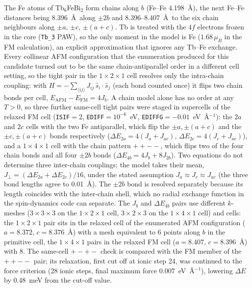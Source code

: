 \documentclass[aps,prb,preprint,superscriptaddress,longbibliography,nofootinbib]{revtex4-2}
\begin{document}
The Fe atoms of Tb$_6$FeBi$_2$ form chains along $b$ (Fe--Fe 4.198~\AA), the next Fe--Fe distances being
8.396~\AA\ along $\pm2b$ and 8.396--8.407~\AA\ to the six chain neighbours along $\pm a$, $\pm c$, $\pm(a+c)$.
Tb is treated with the $4f$ electrons frozen in the core (\texttt{Tb\_3} PAW), so the only moment in the model
is Fe ($1.68\,\mu_B$ in the FM calculation), an explicit approximation that ignores any Tb--Fe exchange. Every
collinear AFM configuration that the enumeration produced for this candidate turned out to be the same
chain-antiparallel order in a different cell setting, so the tight pair in the $1\times2\times1$ cell resolves
only the intra-chain coupling: with $H=-\sum_{\langle ij\rangle}J_{ij}\,\hat{s}_i\!\cdot\!\hat{s}_j$ (each bond
counted once) it flips two chain bonds per cell, $E_\mathrm{AFM}-E_\mathrm{FM}=4J_b$. A chain model alone has
no order at any $T>0$, so three further same-cell tight pairs were staged in supercells of the relaxed FM cell
(\texttt{ISIF}$=2$, \texttt{EDIFF}$=10^{-6}$~eV, \texttt{EDIFFG}$=-0.01$~eV~\AA$^{-1}$): the $2a$ and $2c$
cells with the two Fe antiparallel, which flip the $\pm a,\pm(a+c)$ and the $\pm c,\pm(a+c)$ bonds
respectively ($\Delta E_{2a}=4(J_a+J_{ac})$, $\Delta E_{2c}=4(J_c+J_{ac})$), and a $1\times4\times1$ cell with
the chain pattern $++--$, which flips two of the four chain bonds and all four $\pm2b$ bonds
($\Delta E_{4b}=4J_b+8J_{2b}$). Two equations do not determine three inter-chain couplings; the model takes
their mean, $J_\perp=(\Delta E_{2a}+\Delta E_{2c})/16$, under the stated assumption $J_a\approx J_c\approx
J_{ac}$ (the three bond lengths agree to 0.01~\AA). The $\pm2b$ bond is resolved separately because its length
coincides with the inter-chain shell, which no radial exchange function in the spin-dynamics code can
separate. The $J_b$ and $\Delta E_{4b}$ pairs use different $k$-meshes ($3\times3\times3$ on the
$1\times2\times1$ cell, $3\times2\times3$ on the $1\times4\times1$ cell) and cells: the $1\times2\times1$ pair
sits in the relaxed cell of the enumerated AFM configuration ($a=8.372$, $c=8.376$~\AA) with a mesh equivalent
to 6 points along $b$ in the primitive cell, the $1\times4\times1$ pairs in the relaxed FM cell ($a=8.407$,
$c=8.396$~\AA) with 8. The same-cell $+-+-$ check is compared with the FM member of the $++--$ pair; its
relaxation, first cut off at ionic step 24, was continued to the force criterion (28 ionic steps, final
maximum force 0.007~eV~\AA$^{-1}$), lowering $\Delta E$ by 0.48~meV from the cut-off value.
\end{document}
